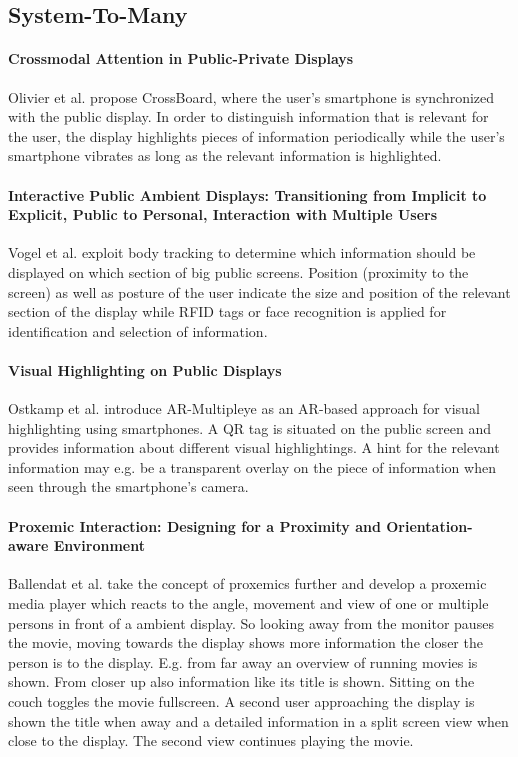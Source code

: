 \subsection{System-To-Many}

\paragraph{Crossmodal Attention in Public-Private Displays}
Olivier et al. \cite{Olivier_Crossmodal} propose CrossBoard, where the user’s smartphone is synchronized with the public display.
In order to distinguish information that is relevant for the user, the display highlights pieces of information periodically while the user’s smartphone vibrates as long as the relevant information is highlighted.

\paragraph{Interactive Public Ambient Displays: Transitioning from Implicit to Explicit, Public to Personal, Interaction with Multiple Users}
Vogel et al.\cite{Vogel_InteractivePublicAmbient} exploit body tracking to determine which information should be displayed on which section of big public screens. Position (proximity to the screen) as well as posture of the user indicate the size and position of the relevant section of the display while RFID tags or face recognition is applied for identification and selection of information.

\paragraph{Visual Highlighting on Public Displays}
Ostkamp et al. \cite{Ostkamp_VisualHighlighting} introduce AR-Multipleye as an AR-based approach for visual highlighting using smartphones. A QR tag is situated on the public screen and provides information about different visual highlightings. A hint for the relevant information may e.g. be a transparent overlay on the piece of information when seen through the smartphone’s camera.

\paragraph{Proxemic Interaction: Designing for a Proximity and Orientation-aware Environment}
Ballendat et al. \cite{ballendat_proxemic_2010} take the concept of proxemics further and develop a proxemic media player which reacts to the angle, movement and view of one or multiple persons in front of a ambient display.
So looking away from the monitor pauses the movie, moving towards the display shows more information the closer the person is to the display.
E.g. from far away an overview of running movies is shown.
From closer up also information like its title is shown.
Sitting on the couch toggles the movie fullscreen.
A second user approaching the display is shown the title when away and a detailed information in a split screen view when close to the display.
The second view continues playing the movie.


